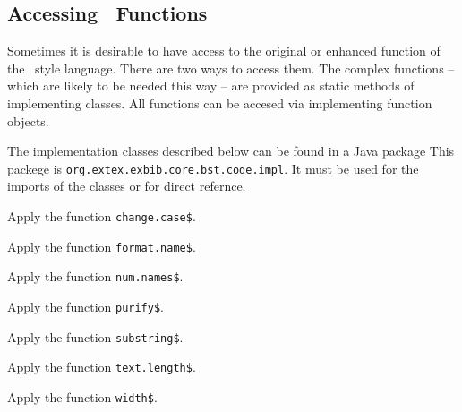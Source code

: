 \subsection{Accessing \BibTeX\ Functions}

Sometimes it is desirable to have access to the original or enhanced
function of the \BibTeX\ style language. There are two ways to access
them. The complex functions -- which are likely to be needed this way
-- are provided as static methods of implementing classes. All
functions can be accesed via implementing function objects.

The implementation classes described below can be found in a Java
package This packege is \texttt{org.extex.exbib.core.bst.code.impl}.
It must be used for the imports of the classes or for direct refernce.

\begin{methods}

  Apply the function \texttt{change.case\$}.

  Apply the function \texttt{format.name\$}.

  Apply the function \texttt{num.names\$}.

  Apply the function \texttt{purify\$}.

  Apply the function \texttt{substring\$}.

  Apply the function \texttt{text.length\$}.

  Apply the function \texttt{width\$}.

\end{methods}
\endinput%
%
